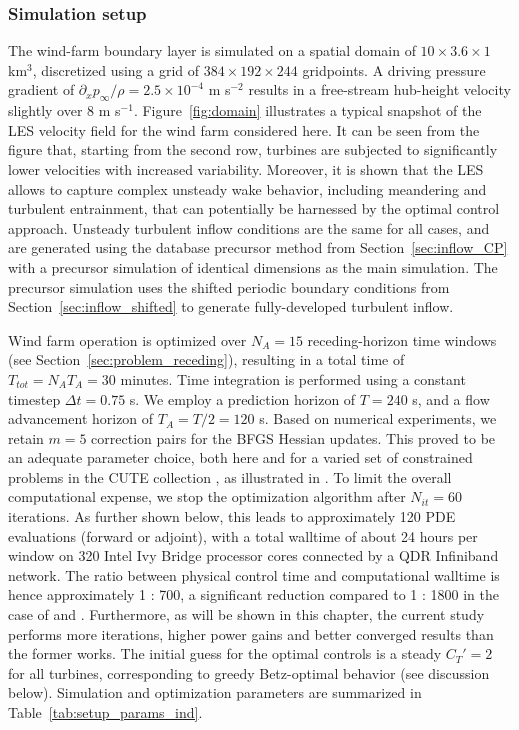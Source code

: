 \subsubsection{Simulation setup}
The wind-farm boundary layer is simulated on a spatial domain of $10 \times 3.6 \times 1$ km$^3$, discretized using a grid of $384 \times 192 \times 244$ gridpoints. A driving pressure gradient of $\partial_x p_\infty/\rho = 2.5 \times 10^{-4}$ m s$^{-2}$ results in a free-stream hub-height velocity slightly over 8 m s$^{-1}$. Figure~\ref{fig:domain} illustrates a typical snapshot of the LES velocity field for the wind farm considered here. It can be seen from the figure that, starting from the second row, turbines are subjected to significantly lower velocities with increased variability. Moreover, it is shown that the LES allows to capture complex unsteady wake behavior, including meandering and turbulent entrainment, that can potentially be harnessed by the optimal control approach. Unsteady turbulent inflow conditions are the same for all cases, and are generated using the database precursor method from Section~\ref{sec:inflow_CP} with a precursor simulation of identical dimensions as the main simulation. The precursor simulation uses the shifted periodic boundary conditions from Section~\ref{sec:inflow_shifted} to generate fully-developed turbulent inflow.  

Wind farm operation is optimized over $N_A = 15$ receding-horizon time windows (see Section~\ref{sec:problem_receding}), resulting in a total time of $T_{tot} = N_AT_A = 30$ minutes. Time integration is performed using a constant timestep $\Delta t = 0.75$ s. We employ a prediction horizon of $T = 240$ s, and a flow advancement horizon of $T_A = T/2 = 120$ s. Based on numerical experiments, we retain $m = 5$ correction pairs for the BFGS Hessian updates. This proved to be an adequate parameter choice, both here and for a varied set of constrained problems in the CUTE collection \citep{bongartz1995cute}, as illustrated in \cite{byrd1995limited}. To limit the overall computational expense, we stop the optimization algorithm after $N_{it} = 60$ iterations. As further shown below, this leads to approximately 120 PDE evaluations (forward or adjoint), with a total walltime of about 24 hours per window on 320 Intel Ivy Bridge processor cores connected by a QDR Infiniband network. The ratio between physical control time and computational walltime is hence approximately 1 : 700, a significant reduction compared to 1 : 1800 in the case of \cite{goit2015optimal} and \cite{goit2016optimal}. Furthermore, as will be shown in this chapter, the current study performs more iterations, higher power gains and better converged results than the former works. The initial guess for the optimal controls is a steady $C_T' = 2$ for all turbines, corresponding to greedy Betz-optimal behavior (see discussion below). Simulation and optimization parameters are summarized in Table~\ref{tab:setup_params_ind}. 


